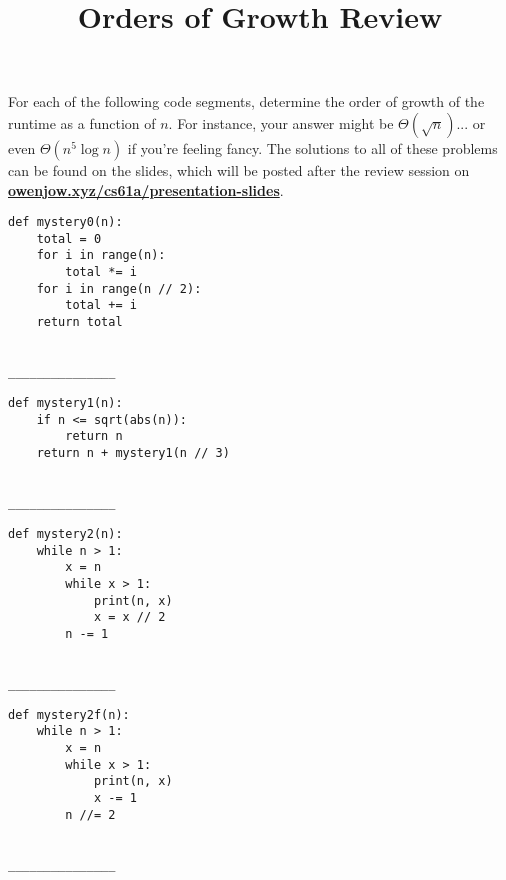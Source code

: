 \documentclass[twoside]{article}
\title{\sc Orders of Growth Review}
\begin{document}
\thispagestyle{empty}
\maketitle

For each of the following code segments, determine the order of growth of the runtime as a function of $n$. For instance, your answer might be $\Theta(\sqrt{n})$... or even $\Theta(n^5\log{n})$ if you're feeling fancy. The solutions to all of these problems can be found on the slides, which will be posted after the review session on \href{http://owenjow.xyz/cs61a/presentation-slides/}{\textbf{owenjow.xyz/cs61a/presentation-slides}}.

\begin{enumerate}


\begin{lstlisting}
def mystery0(n):
    total = 0
    for i in range(n):
        total *= i
    for i in range(n // 2):
        total += i
    return total
\end{lstlisting}
~\\
\lstinline{_______________}


\begin{lstlisting}
def mystery1(n):
    if n <= sqrt(abs(n)):
        return n
    return n + mystery1(n // 3)
\end{lstlisting}
~\\
\lstinline{_______________}


\begin{lstlisting}
def mystery2(n):
    while n > 1:
        x = n
        while x > 1:
            print(n, x)
            x = x // 2
        n -= 1
\end{lstlisting}
~\\
\lstinline{_______________}

\begin{lstlisting}
def mystery2f(n):
    while n > 1:
        x = n
        while x > 1:
            print(n, x)
            x -= 1
        n //= 2
\end{lstlisting}
~\\
\lstinline{_______________}



\end{enumerate}
\end{document}
